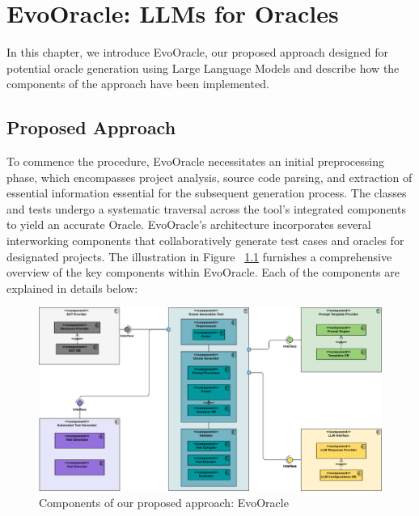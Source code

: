\chapter{EvoOracle: LLMs for Oracles}
\label{cha:evoOracles}
\vspace{0.4 cm}

In this chapter, we introduce EvoOracle, our proposed approach designed for potential oracle generation using Large Language Models and describe how the components of the approach have been implemented. 

\section{Proposed Approach}
\label{sec:approach}
\vspace{0.2 cm}

To commence the procedure, EvoOracle necessitates an initial preprocessing phase, which encompasses project analysis, source code parsing, and extraction of essential information essential for the subsequent generation process. The classes and tests undergo a systematic traversal across the tool's integrated components to yield an accurate Oracle. EvoOracle's architecture incorporates several interworking components that collaboratively generate test cases and oracles for designated projects. The illustration in Figure ~\ref{fig:component_diagram} furnishes a comprehensive overview of the key components within EvoOracle. Each of the components are explained in details below:

\begin{figure}[H]
\centering
\includegraphics[width=1\textwidth]{images/EvoOracle_ components.png}
\caption{Components of our proposed approach: EvoOracle}
\label{fig:component_diagram}
\end{figure}


